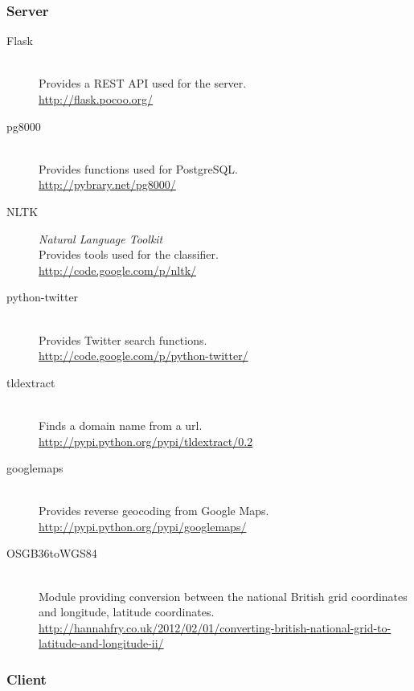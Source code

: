 \subsubsection{Server}

\begin{description}
    \item[Flask]  \hfill \\
        Provides a REST API used for the server.\\
        \url{http://flask.pocoo.org/}
    \item[pg8000]  \hfill \\
        Provides functions used for PostgreSQL.\\
        \url{http://pybrary.net/pg8000/}
    \item[NLTK] \emph{Natural Language Toolkit} \hfill \\
        Provides tools used for the classifier.\\
        \url{http://code.google.com/p/nltk/}
    \item[python-twitter] \hfill \\
        Provides Twitter search functions.\\
        \url{http://code.google.com/p/python-twitter/}
    \item[tldextract] \hfill \\
        Finds a domain name from a url.\\
        \url{http://pypi.python.org/pypi/tldextract/0.2}
    \item[googlemaps] \hfill \\
        Provides reverse geocoding from Google Maps.\\
        \url{http://pypi.python.org/pypi/googlemaps/}
    \item[OSGB36toWGS84] \hfill \\
        Module providing conversion between the national British grid coordinates and longitude, latitude coordinates.\\
        \url{http://hannahfry.co.uk/2012/02/01/converting-british-national-grid-to-latitude-and-longitude-ii/}
\end{description}

\subsubsection{Client}

